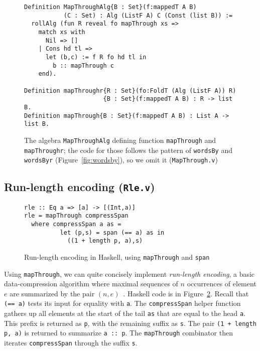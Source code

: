 \documentclass[a4paper,USenglish]{lipics-v2021}
\begin{document}
\begin{figure}
\begin{verbatim}
Definition MapThroughAlg{B : Set}(f:mappedT A B)
           (C : Set) : Alg (ListF A) C (Const (list B)) :=
  rollAlg (fun R reveal fo mapThrough xs => 
    match xs with
      Nil => []
    | Cons hd tl =>
      let (b,c) := f R fo hd tl in
        b :: mapThrough c
    end).

Definition mapThroughr{R : Set}(fo:FoldT (Alg (ListF A)) R)
                      {B : Set}(f:mappedT A B) : R -> list B.
Definition mapThrough{B : Set}(f:mappedT A B) : List A -> list B.
\end{verbatim}
\caption{The algebra \texttt{MapThroughAlg} defining function \texttt{mapThrough} and \texttt{mapThroughr}; the
  code for those follows the pattern of \texttt{wordsBy} and \texttt{wordsByr} (Figure~\ref{fig:wordsby}), so
  we omit it (\texttt{MapThrough.v})}
\label{fig:mapthrough}
\end{figure}

\subsection{Run-length encoding (\texttt{Rle.v})}

\begin{figure}
\begin{verbatim}
rle :: Eq a => [a] -> [(Int,a)]
rle = mapThrough compressSpan
  where compressSpan a as =
          let (p,s) = span (== a) as in
            ((1 + length p, a),s)
\end{verbatim} 
\caption{Run-length encoding in Haskell, using \texttt{mapThrough} and \texttt{span}}
\label{fig:rlehs}
\end{figure}

Using \verb|mapThrough|, we can quite concisely implement
\emph{run-length encoding}, a basic data-compression algorithm where
maximal sequences of $n$ occurrences of element $e$ are summarized by
the pair $(n,e)$~\cite{datacomp}.  Haskell code is in Figure~\ref{fig:rlehs}.
Recall that \verb|(== a)| 
tests its input for equality with \verb|a|.  The
\verb|compressSpan| helper function gathers up all elements at the
start of the tail \verb|as| that are equal to the head \verb|a|.  This
prefix is returned as \verb|p|, with the remaining suffix as \verb|s|.
The pair \verb|(1 + length p, a)| is returned to summarize
\verb|a :: p|.  The \verb|mapThrough| combinator then iterates
\verb|compressSpan| through the suffix \verb|s|.
\end{document}
